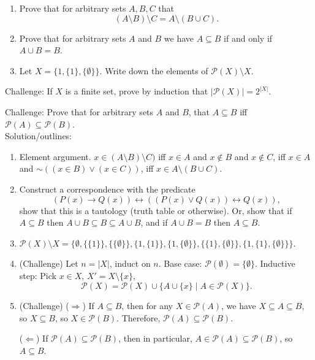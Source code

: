 \documentclass[a4paper,12pt]{article}
\begin{document}
\pagestyle{myheadings}

\begin{enumerate}
\item Prove that for arbitrary sets $A,B,C$ that
\[
    (A \setminus B) \setminus C = A \setminus (B \cup C).
\]
\item Prove that for arbitrary sets $A$ and $B$ we have $A \subseteq B$ if and
only if $A \cup B = B$.
\item Let $X = \{1, \{1\}, \{\emptyset\}\}$.
Write down the elements of $\mathcal{P}(X) \setminus X$.
\end{enumerate}

Challenge: If $X$ is a finite set, prove by induction that
$|\mathcal{P}(X)| = 2^{|X|}$.

Challenge: Prove that for arbitrary sets $A$ and $B$, that $A \subseteq B$ iff
$\mathcal{P}(A) \subseteq \mathcal{P}(B)$.
\\

Solution/outlines:

\begin{enumerate}
\item Element argument. $x \in (A \setminus B) \setminus C)$ iff
$x \in A$ and $x \not \in B$ and $x \not \in C$, iff $x \in A$ and
$\sim((x \in B) \lor (x \in C))$, iff $x \in A \setminus (B \cup C)$.
\item Construct a correspondence with the predicate
\[
    (P(x) \to Q(x)) \leftrightarrow ((P(x) \lor Q(x)) \leftrightarrow Q(x)),
\]
show that this is a tautology (truth table or otherwise). Or, show that if
$A \subseteq B$ then $A \cup B \subseteq B \subseteq A \cup B$, and if
$A \cup B = B$ then $A \subseteq B$.
\item $\mathcal{P}(X) \setminus X = \big\{\emptyset, \{\{1\}\}, \{\{\emptyset\}\},
\{1, \{1\}\}, \{1, \{\emptyset\}\}, \{\{1\}, \{\emptyset\}\},
\{1, \{1\}, \{\emptyset\}\}\big\}$.
\item (Challenge) Let $n = |X|$, induct on $n$. Base case: $\mathcal{P}(\emptyset)
= \{\emptyset\}$. Inductive step: Pick $x \in X$, $X' = X \setminus \{x\}$,
\[
    \mathcal{P}(X) = \mathcal{P}(X) \cup \{ A \cup \{x\} \mid A \in \mathcal{P}(X)  \}.
\]
\item (Challenge) ($\Rightarrow$) If $A \subseteq B$, then for any $X \in
\mathcal{P}(A)$, we have $X \subseteq A \subseteq B$, so $X \subseteq B$, so
$X \in \mathcal{P}(B)$. Therefore, $\mathcal{P}(A) \subseteq \mathcal{P}(B)$.

($\Leftarrow$) If $\mathcal{P}(A) \subseteq \mathcal{P}(B)$, then in particular,
$A \in \mathcal{P}(A) \subseteq \mathcal{P}(B)$, so $A \subseteq B$.
\end{enumerate}
\end{document}
